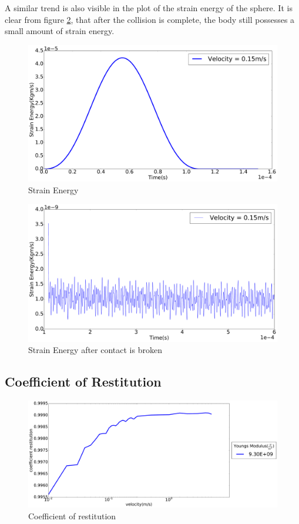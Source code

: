 A similar trend is also visible in the plot of the strain energy of the sphere. It is clear from figure \ref{fig:SEzoomed}, that after the collision is complete, the body still possesses a small amount of strain energy.

\begin{figure}[H]
\includegraphics[width=1.0\textwidth]{../images/StrainEnergy/SE_pdf.pdf}
\caption{Strain Energy}
\label{fig:SE}
\end{figure}
\begin{figure}[H]
\includegraphics[width=1.0\textwidth]{../images/StrainEnergy/SEzoomed_pdf.pdf}
\caption{Strain Energy after contact is broken}
\label{fig:SEzoomed}
\end{figure}


\subsection{Coefficient of Restitution}

\begin{figure}[H]
\includegraphics[scale=0.25]{../images/COR/COR_pdf.pdf}
\caption{Coefficient of restitution}
\label{fig:COR}
\end{figure}

